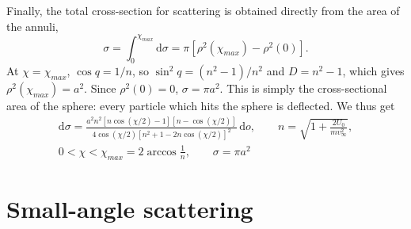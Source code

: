 \begin{problem}[title={Scattering by a spherical potential well}]
{Finally, the total cross-section for scattering is obtained directly from the area of the annuli,
\begin{equation*}
    \sigma = \int_0^{\chi_{max}} \mathrm{d}\sigma = \pi\left[ \rho^2(\chi_{max}) - \rho^2(0) \right].
\end{equation*}
At $\chi = \chi_{max}$, $\cos{q} = 1/n$, so $\sin^2{q} = (n^2 - 1)/n^2$ and $D = n^2 - 1$, which gives $\rho^2(\chi_{max}) = a^2$. Since $\rho^2(0) = 0$, $\sigma = \pi a^2$. This is simply the cross-sectional area of the sphere: every particle which hits the sphere is deflected. We thus get
}
{
\begin{gather*}
    \mathrm{d}\sigma = \frac{a^2n^2\left[ n\cos(\chi/2) - 1 \right]\left[ n - \cos(\chi/2) \right]}{4\cos(\chi/2)\left[ n^2 + 1 - 2n\cos(\chi/2) \right]^2}\,\mathrm{d}o, \qquad n = \sqrt{1 + \frac{2U_0}{mv_\infty^2}}, \\
    0 < \chi < \chi_{max} = 2\arccos{\frac{1}{n}}, \qquad \sigma = \pi a^2
\end{gather*}
}
\end{problem}

\section{Small-angle scattering}


